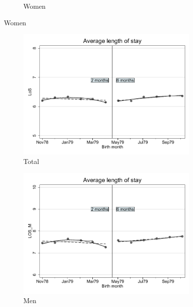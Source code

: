 \documentclass[a4paper ]{article}
\begin{document}
\begin{figure}[h!]
\begin{subfigure}[t]{0.31\textwidth}
		\caption{Women}
	\end{subfigure}
\end{figure}
\newpage
\begin{figure}[h]
	\centering
	\begin{subfigure}[t]{0.31\textwidth}
		\centering
		\includegraphics[width=0.99\textwidth]{R1_RD_LOS_fits}
		\caption{Total}		
	\end{subfigure}
	\begin{subfigure}[t]{0.31\textwidth}
		\centering
		\includegraphics[width=0.99\textwidth]{R1_RD_LOS_M_fits}
		\caption{Men}		
	\end{subfigure}
	\quad
	\begin{subfigure}[t]{0.31\textwidth}

\end{subfigure}
\end{figure}
\end{document}
